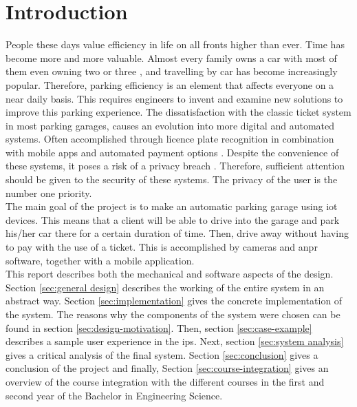\section{Introduction}\label{Introduction}

People these days value efficiency in life on all fronts higher than ever. Time has become more and more valuable. Almost every family owns a car with most of them even owning two or three \cite{vehicles_in_families}, and travelling by car has become increasingly popular. Therefore, parking efficiency is an element that affects everyone on a near daily basis. This requires engineers to invent and examine new solutions to improve this parking experience. The dissatisfaction with the classic ticket system in most parking garages, causes an evolution into more digital and automated systems. Often accomplished through licence plate recognition in combination with mobile apps and automated payment options \cite{4411}. Despite the convenience of these systems, it poses a risk of a privacy breach \cite{privacy_breach}. Therefore, sufficient attention should be given to the security of these systems. The privacy of the user is the number one priority.\\

The main goal of the project is to make an automatic parking garage using \ac{iot} devices. This means that a client will be able to drive into the garage and park his/her car there for a certain duration of time. Then, drive away without having to pay with the use of a ticket. This is accomplished by cameras and \ac{anpr} software, together with a mobile application. \\

This report describes both the mechanical and software aspects of the design. Section \ref{sec:general design} describes the working of the entire system in an abstract way. Section \ref{sec:implementation} gives the concrete implementation of the system. The reasons why the components of the system were chosen can be found in section \ref{sec:design-motivation}. Then, section \ref{sec:case-example} describes a sample user experience in the \ac{ips}. Next, section \ref{sec:system analysis} gives a critical analysis of the final system. Section \ref{sec:conclusion} gives a conclusion of the project and finally, Section \ref{sec:course-integration} gives an overview of the course integration with the different courses in the first and second year of the Bachelor in Engineering Science.

